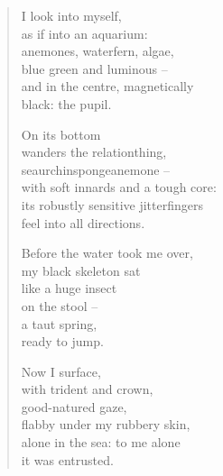 \vspace*{-\baselineskip}
\begin{verse}

I look into myself,\\
as if into an aquarium:\\
anemones, waterfern, algae,\\
blue green and luminous --\\
and in the centre, magnetically\\
black: the pupil.

On its bottom\\
wanders the relationthing,\\
seaurchinspongeanemone --\\
with soft innards and a tough core:\\
its robustly sensitive jitterfingers\\
feel into all directions.

Before the water took me over,\\
my black skeleton sat\\
like a huge insect\\
on the stool --\\
a taut spring,\\
ready to jump.

Now I surface,\\
with trident and crown,\\
good-natured gaze,\\
flabby under my rubbery skin,\\
alone in the sea: to me alone\\
it was entrusted.

\end{verse}

